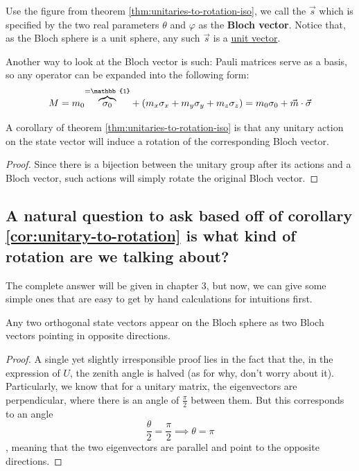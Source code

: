 \documentclass[12pt]{article}
\begin{document}
\begin{definition}
Use the figure from theorem \ref{thm:unitaries-to-rotation-iso}, we call the $\vec{s}$ which is specified by the two real parameters $\theta$ and $\varphi$ as the \textbf{Bloch vector}. Notice that, as the Bloch sphere is a unit sphere, any such $\vec{s}$ is a \underline{unit vector}.

Another way to look at the Bloch vector is such: Pauli matrices serve as a basis, so any operator can be expanded into the following form: $$
M = m_0\overset{=\mathbb{1}}{\overbrace{\sigma_0}} + \prt{m_x\sigma_x + m_y\sigma_y + m_z\sigma_z} = m_0\sigma_0 + \vec{m}\cdot \vec{\sigma}
$$
\end{definition}

\begin{corollary}\label{cor:unitary-to-rotation}
A corollary of theorem \ref{thm:unitaries-to-rotation-iso} is that any unitary action on the state vector will induce a rotation of the corresponding Bloch vector.
\end{corollary}
\begin{proof}
Since there is a bijection between the unitary group after its actions and a Bloch vector, such actions will simply rotate the original Bloch vector.
\end{proof}

\subsection{A natural question to ask based off of corollary \ref{cor:unitary-to-rotation} is what kind of rotation are we talking about?}
The complete answer will be given in chapter 3, but now, we can give some simple ones that are easy to get by hand calculations for intuitions first.

\begin{proposition}\label{prop:orth-state-vec-on-bloch}
Any two orthogonal state vectors appear on the Bloch sphere as two Bloch vectors pointing in opposite directions.
\end{proposition}
\begin{proof}
A single yet slightly irresponsible proof lies in the fact that the, in the expression of $U$, the zenith angle is halved (as for why, don't worry about it). Particularly, we know that for a unitary matrix, the eigenvectors are perpendicular, where there is an angle of $\frac{\pi}{2}$ between them. But this corresponds to an angle $$
\frac{\theta}{2} = \frac{\pi}{2}\implies \theta = \pi
$$, meaning that the two eigenvectors are parallel and point to the opposite directions.
\end{proof}
\end{document}

